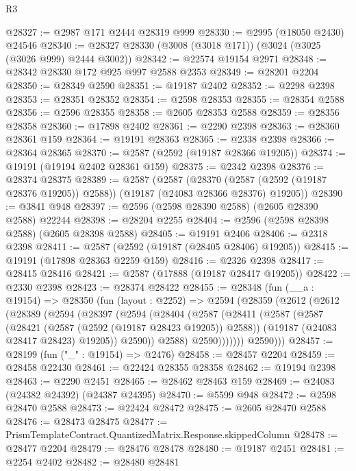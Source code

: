 \begin{lexlean}{R3}
\begin{coremodule}
@28327 := @2987 @171 @2444 @28319 @999
@28330 := @2995 (@18050 @2430) @24546
@28340 := @28327 @28330 (@3008 (@3018 @171)) (@3024 (@3025 (@3026 @999) @2444 @3002))
@28342 := @22574 @19154 @2971
@28348 := @28342 @28330 @172 @925 @997 @2588 @2353
@28349 := @28201 @2204
@28350 := @28349 @2590
@28351 := @19187 @2402
@28352 := @2298 @2398
@28353 := @28351 @28352
@28354 := @2598 @28353
@28355 := @28354 @2588
@28356 := @2596 @28355
@28358 := @2605 @28353 @2588
@28359 := @28356 @28358
@28360 := @17898 @2402
@28361 := @2290 @2398
@28363 := @28360 @28361 @159
@28364 := @19191 @28363
@28365 := @2338 @2398
@28366 := @28364 @28365
@28370 := @2587 (@2592 (@19187 @28366 @19205))
@28374 := @19191 (@19194 @2402 @28361 @159)
@28375 := @2342 @2398
@28376 := @28374 @28375
@28389 := @2587
    (@2587
      (@28370 (@2587 (@2592 (@19187 @28376 @19205)) @2588))
      (@19187 (@24083 @28366 @28376) @19205))
@28390 := @3841 @948
@28397 := @2596 (@2598 @28390 @2588) (@2605 @28390 @2588) @22244
@28398 := @28204 @2255
@28404 := @2596 (@2598 @28398 @2588) (@2605 @28398 @2588)
@28405 := @19191 @2406
@28406 := @2318 @2398
@28411 := @2587 (@2592 (@19187 (@28405 @28406) @19205))
@28415 := @19191 (@17898 @28363 @2259 @159)
@28416 := @2326 @2398
@28417 := @28415 @28416
@28421 := @2587 (@17888 (@19187 @28417 @19205))
@28422 := @2330 @2398
@28423 := @28374 @28422
@28455 := @28348
    (fun (__a : @19154) =>
    @28350
      (fun (layout : @2252) =>
      @2594
        (@28359
          (@2612
            (@2612
              (@28389
                (@2594
                  (@28397
                    (@2594
                      (@28404
                        (@2587
                          (@28411
                            (@2587
                              (@2587
                                (@28421 (@2587 (@2592 (@19187 @28423 @19205)) @2588))
                                (@19187 (@24083 @28417 @28423) @19205))
                              @2590))
                          @2588)
                        @2590)))))))
          @2590)))
@28457 := @28199 (fun ("_" : @19154) => @2476)
@28458 := @28457 @2204
@28459 := @28458 @22430
@28461 := @22424 @28355 @28358
@28462 := @19194 @2398
@28463 := @2290 @2451
@28465 := @28462 @28463 @159
@28469 := @24083 (@24382 @24392) (@24387 @24395)
@28470 := @5599 @948
@28472 := @2598 @28470 @2588
@28473 := @22424 @28472
@28475 := @2605 @28470 @2588
@28476 := @28473 @28475
@28477 := PrismTemplateContract.QuantizedMatrix.Response.skippedColumn
@28478 := @28477 @2204
@28479 := @28476 @28478
@28480 := @19187 @2451
@28481 := @2254 @2402
@28482 := @28480 @28481

\end{coremodule}
\end{lexlean}
